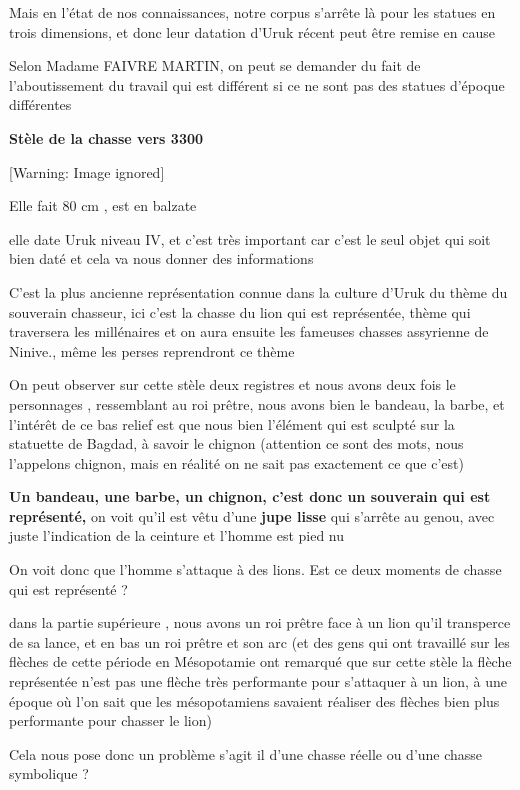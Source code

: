\documentclass[a4paper,10pt]{article}
\begin{document}
\begin{itemize}
Mais en l'état de nos connaissances, notre corpus
s'arrête là pour les statues en trois dimensions,  et
donc leur datation d'Uruk récent peut être remise en
cause 

Selon Madame FAIVRE MARTIN, on peut se demander du fait de
l'aboutissement du travail qui est différent si ce ne
sont pas des statues d'époque différentes

\textbf{Stèle de la chasse vers 3300}

  [Warning: Image ignored] %
 

Elle fait 80 cm , est en balzate

elle date Uruk niveau IV, et c'est très important car
c'est le seul objet qui soit bien daté et cela va nous
donner des informations

C'est la plus ancienne représentation connue dans la
culture d'Uruk du thème du souverain chasseur, ici
c'est la chasse du lion qui est représentée, thème qui
traversera les millénaires et on aura ensuite les fameuses chasses
assyrienne de Ninive., même les perses reprendront ce thème 

On peut observer sur cette stèle deux registres et nous avons deux fois
le personnages , ressemblant au roi prêtre, nous avons bien le bandeau,
la barbe, et l'intérêt de ce bas relief est que nous
bien l'élément qui est sculpté sur la statuette de
Bagdad, à savoir le chignon (attention ce sont des mots, nous
l'appelons chignon, mais en réalité on ne sait pas
exactement ce que c'est)

\textbf{Un bandeau, une barbe, un chignon, c'est donc
un souverain qui est représenté,} on voit qu'il est
vêtu d'une \textbf{jupe lisse} qui
s'arrête au genou, avec juste
l'indication de la ceinture et
l'homme est pied nu

On voit donc que l'homme s'attaque à
des lions. Est ce deux moments de chasse qui est représenté ? 

dans la partie supérieure , nous avons un roi prêtre face à un lion
qu'il transperce de sa lance, et en bas un roi prêtre
et son arc (et des gens qui ont travaillé sur les flèches de cette
période en Mésopotamie ont remarqué que sur cette stèle la flèche
représentée n'est pas une flèche très performante pour
s'attaquer à un lion, à une époque où
l'on sait que les mésopotamiens savaient réaliser des
flèches bien plus performante pour chasser le lion)

Cela nous pose donc un problème  s'agit il
d'une chasse réelle ou d'une chasse
symbolique ?


\end{itemize}
\end{document}
